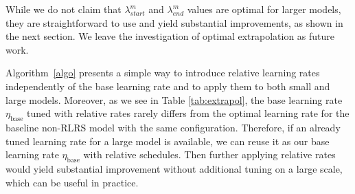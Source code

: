 \documentclass{article}
\theoremstyle{plain}
\theoremstyle{definition}
\theoremstyle{remark}
\newcommand{\jl}[1]{\textcolor{green}{[JL: #1]}}
\begin{document}
    While we do not claim that $\lambda_{\textit{start}}^m$ and $\lambda_{\textit{end}}^m$ values are optimal for larger models, they are straightforward to use and yield substantial improvements, as shown in the next section. We leave the investigation of optimal extrapolation as future work. %
    
    
    
    Algorithm~\ref{algo} presents a simple way to introduce relative learning rates independently of the base learning rate and to apply them to both small and large models. Moreover, as we see in Table \ref{tab:extrapol}, the base learning rate $\eta_{\text{base}}$ tuned with relative rates rarely differs from the optimal learning rate for the baseline non-RLRS model with the same configuration. Therefore, if an already tuned learning rate for a large model is available, we can reuse it as our base learning rate $\eta_{\text{base}}$ with relative schedules. Then further applying relative rates would yield substantial improvement without additional tuning on a large scale, which can be useful in practice.
    
    
    
\end{document}
